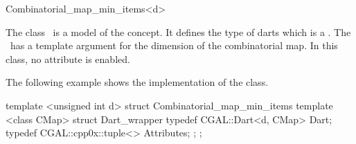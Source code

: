 \ccRefPageBegin

\begin{ccRefClass}{Combinatorial_map_min_items<d>}


\ccDefinition
  
The class \ccRefName\ is a model of the 
concept. It defines the type of darts which is a
.  The \ccRefName\ has a
template argument for the dimension of the combinatorial map.
In this class, no attribute is enabled.

\ccIsModel
{}

\ccExample

The following example shows the implementation of the
 class.

\begin{ccExampleCode}
template <unsigned int d>
struct Combinatorial_map_min_items
{
   template <class CMap>
   struct Dart_wrapper
   {
     typedef CGAL::Dart<d, CMap> Dart;
     typedef CGAL::cpp0x::tuple<> Attributes;
   };
};
\end{ccExampleCode}

\ccSeeAlso
{}\\


\end{ccRefClass}

\ccRefPageEnd
